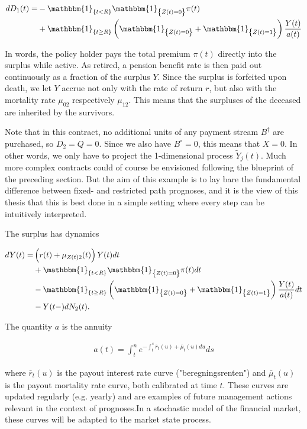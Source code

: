 \documentclass{article}
\newcommand{\1}[1]{\mathbbm{1}_{\left\lbrace #1 \right\rbrace}}
\theoremstyle{break}
\theoremstyle{remark}
\numberwithin{equation}{section}
\begin{document}
\begin{align*}
	dD_1(t) =& - \1{t<R} \1{Z(t)=0} \pi(t) \\
	&+ \1{t \geq R} \left( \1{Z(t)=0} + \1{Z(t)=1} \right) \frac{Y(t)}{a(t)}
\end{align*}

In words, the policy holder pays the total premium $\pi(t)$ directly into the surplus while active. As retired, a pension benefit rate is then paid out continuously as a fraction of the surplus $Y$. Since the surplus is forfeited upon death, we let $Y$ accrue not only with the rate of return $r$, but also with the mortality rate $\mu_{02}$ respectively $\mu_{12}$. This means that the surpluses of the deceased are inherited by the survivors.

Note that in this contract, no additional units of any payment stream $B^\dagger$ are purchased, so $D_2=Q=0$. Since we also have $B^\circ=0$, this means that $X=0$. In other words, we only have to project the 1-dimensional process $\tilde{Y}_j(t)$. Much more complex contracts could of course be envisioned following the blueprint of the preceding section. But the aim of this example is to lay bare the fundamental difference between fixed- and restricted path prognoses, and it is the view of this thesis that this is best done in a simple setting where every step can be intuitively interpreted.

The surplus has dynamics

\begin{align} \label{YExampleDyn}
\begin{split}
		dY(t) =& \left( r(t) + \mu_{Z(t)2}(t) \right) Y(t) dt \\
	&+ \1{t<R} \1{Z(t)=0} \pi(t) dt \\
	&- \1{t \geq R} \left( \1{Z(t)=0} + \1{Z(t)=1} \right) \frac{Y(t)}{a(t)} dt \\
	&- Y(t-) dN_2(t).
\end{split}
\end{align}

The quantity $a$ is the annuity

\begin{align} \label{Annuity}
	a(t) = \int_t^n e^{-\int_t^s \bar{r}_t(u) + \bar{\mu}_t(u) du} ds
\end{align}

where $\bar{r}_t(u)$ is the payout interest rate curve ("beregningsrenten") and $\bar{\mu}_t(u)$ is the payout mortality rate curve, both calibrated at time $t$. These curves are updated regularly (e.g. yearly) and are examples of future management actions relevant in the context of prognoses.In a stochastic model of the financial market, these curves will be adapted to the market state process.
\end{document}
